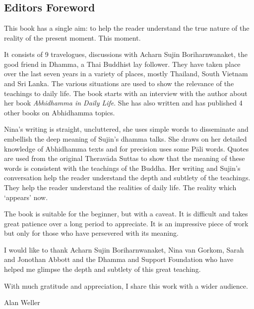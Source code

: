\chapter[Editors Foreword]{}
\section*{Editors Foreword}

This book has a single aim: to help the reader understand the true nature of the reality of the present moment. This moment.

It consists of 9 travelogues, discussions with Acharn Sujin Boriharnwanaket, the good friend in Dhamma, a Thai Buddhist lay follower. They have taken place over the last seven years in a variety of places, mostly Thailand, South Vietnam and Sri Lanka. The various situations are used to show the relevance of the teachings to daily life. The book starts with an interview with the author about her book \textit{Abhidhamma in Daily Life}. She has also written and has published 4 other books on Abhidhamma topics.

Nina's writing is straight, uncluttered, she uses simple words to disseminate and embellish the deep meaning of Sujin's dhamma talks. She draws on her detailed knowledge of Abhidhamma texts and for precision uses some Pāli words. Quotes are used from the original Theravāda Suttas to show that the meaning of these words is consistent with the teachings of the Buddha. Her writing and Sujin's conversation help the reader understand the depth and subtlety of the teachings. They help the reader understand the realities of daily life. The reality which `appears' now.

The book is suitable for the beginner, but with a caveat. It is difficult and takes great patience over a long period to appreciate. It is an impressive piece of work but only for those who have persevered with its meaning.

I would like to thank Acharn Sujin Boriharnwanaket, Nina van Gorkom, Sarah and Jonothan Abbott and the Dhamma and Support Foundation who have helped me glimpse the depth and subtlety of this great teaching. 

With much gratitude and appreciation, I share this work with a wider audience.

Alan Weller